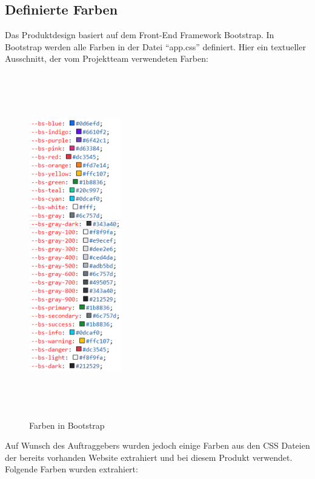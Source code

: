\subsection{Definierte Farben}
Das Produktdesign basiert auf dem Front-End Framework Bootstrap. In Bootstrap werden alle Farben in der Datei “app.css” definiert. Hier ein textueller Ausschnitt, der vom Projektteam verwendeten Farben:
\\
\begin{figure}[h]
	\centering
	\includegraphics[height=15cm,width=4cm]{images/DefinierteFarben}
	\caption{Farben in Bootstrap}
	\label{fig: Farben in Bootstrap}
\end{figure}
\newpage
Auf Wunsch des Auftraggebers wurden jedoch einige Farben aus den CSS Dateien der bereits vorhanden Website extrahiert und bei diesem Produkt verwendet. Folgende Farben wurden extrahiert:
\\

